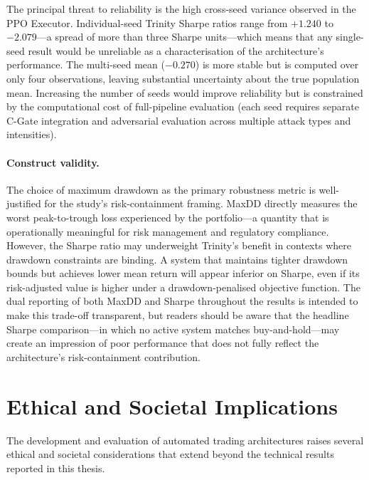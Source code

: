 The principal threat to reliability is the high cross-seed variance observed
in the PPO Executor. Individual-seed Trinity Sharpe ratios range from $+1.240$
to $-2.079$---a spread of more than three Sharpe units---which means that
any single-seed result would be unreliable as a characterisation of the
architecture's performance. The multi-seed mean ($-0.270$) is more stable but
is computed over only four observations, leaving substantial uncertainty
about the true population mean. Increasing the number of seeds would improve
reliability but is constrained by the computational cost of full-pipeline
evaluation (each seed requires separate C-Gate integration and adversarial
evaluation across multiple attack types and intensities).

\paragraph{Construct validity.}
The choice of maximum drawdown as the primary robustness metric is
well-justified for the study's risk-containment framing. MaxDD directly
measures the worst peak-to-trough loss experienced by the portfolio---a
quantity that is operationally meaningful for risk management and regulatory
compliance. However, the Sharpe ratio may underweight Trinity's benefit in
contexts where drawdown constraints are binding. A system that maintains
tighter drawdown bounds but achieves lower mean return will appear inferior
on Sharpe, even if its risk-adjusted value is higher under a drawdown-penalised
objective function. The dual reporting of both MaxDD and Sharpe throughout the
results is intended to make this trade-off transparent, but readers should be
aware that the headline Sharpe comparison---in which no active system matches
buy-and-hold---may create an impression of poor performance that does not fully
reflect the architecture's risk-containment contribution.

\section{Ethical and Societal Implications}
\label{sec:disc-ethics}

The development and evaluation of automated trading architectures raises
several ethical and societal considerations that extend beyond the technical
results reported in this thesis.

